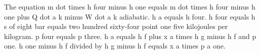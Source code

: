The equation m dot times h four minus h one equals m dot times h four minus h one plus Q dot a k minus W dot a k adiabatic.  
h a equals h four.  
h four equals h s of eight bar equals two hundred sixty-four point one five kilojoules per kilogram.  
p four equals p three.  
h a equals h f plus x a times h g minus h f and p one.  
h one minus h f divided by h g minus h f equals x a times p a one.